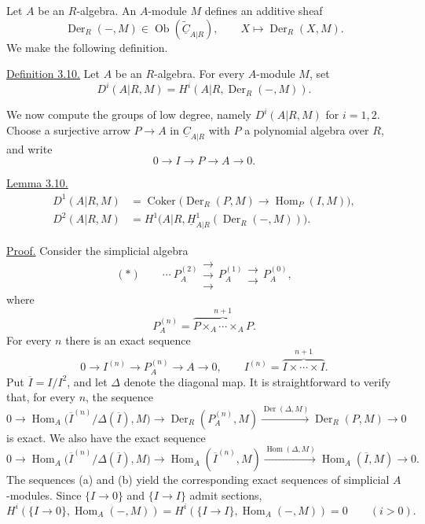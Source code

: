 
Let $A$ be an $R$-algebra. An $A$-module $M$ defines an additive
sheaf
\[
 \operatorname{Der}_R(-,M)
 \in\operatorname{Ob}(\widetilde{\underline C}_{A|R}),
 \qquad X\longmapsto\operatorname{Der}_R(X,M).
\]
We make the following definition.

\underline{Definition 3.10.} Let $A$ be an $R$-algebra. For every
$A$-module $M$, set
\[
 D^i(A|R,M)=H^i(A|R,\operatorname{Der}_R(-,M)).
\]

We now compute the groups of low degree, namely $D^i(A|R,M)$ for
$i=1,2$. Choose a surjective arrow
$P\longrightarrow A$ in $\underline C_{A|R}$ with $P$ a
polynomial algebra over $R$, and write
\[
 0\longrightarrow I\longrightarrow P\longrightarrow A
 \longrightarrow0.
\]

\underline{Lemma 3.10.}
\begin{align*}
 D^1(A|R,M)
 &=\operatorname{Coker}\bigl(
   \operatorname{Der}_R(P,M)\longrightarrow
   \operatorname{Hom}_P(I,M)\bigr),\\
 D^2(A|R,M)
 &=H^1\bigl(A|R,
   \underline H^1_{A|R}(\operatorname{Der}_R(-,M))\bigr).
\end{align*}

\underline{Proof.} Consider the simplicial algebra
\[
 (*)\qquad
 \cdots\ P_A^{(2)}
 \mathrel{\substack{\longrightarrow\\[-.6ex]\longrightarrow\\[-.6ex]\longrightarrow}}
 P_A^{(1)}
 \mathrel{\substack{\longrightarrow\\[-.6ex]\longrightarrow}}
 P_A^{(0)},
\]
where
\[
 P_A^{(n)}=
 \overbrace{P\times_A\cdots\times_AP}^{n+1}.
\]
For every $n$ there is an exact sequence
\[
 0\longrightarrow I^{(n)}\longrightarrow P_A^{(n)}
 \longrightarrow A\longrightarrow0,
 \qquad
 I^{(n)}=\overbrace{I\times\cdots\times I}^{n+1}.
\]
Put $\overline I=I/I^2$, and let $\Delta$ denote the diagonal
map. It is straightforward to verify that, for every $n$, the
sequence
\[
 0\longrightarrow
 \operatorname{Hom}_A
 \bigl(\overline I^{(n)}/\Delta(\overline I),M\bigr)
 \longrightarrow\operatorname{Der}_R(P_A^{(n)},M)
 \xrightarrow{\operatorname{Der}(\Delta,M)}
 \operatorname{Der}_R(P,M)\longrightarrow0
 \tag{a}
\]
is exact. We also have the exact sequence
\[
 0\longrightarrow
 \operatorname{Hom}_A
 \bigl(\overline I^{(n)}/\Delta(\overline I),M\bigr)
 \longrightarrow\operatorname{Hom}_A(\overline I^{(n)},M)
 \xrightarrow{\operatorname{Hom}(\Delta,M)}
 \operatorname{Hom}_A(\overline I,M)\longrightarrow0.
 \tag{b}
\]
The sequences (a) and (b) yield the corresponding exact sequences
of simplicial $A$-modules. Since $\{I\longrightarrow0\}$ and
$\{I\longrightarrow I\}$ admit sections,
\[
 H^i(\{I\longrightarrow0\},\operatorname{Hom}_A(-,M))
 =H^i(\{I\longrightarrow I\},\operatorname{Hom}_A(-,M))=0
 \qquad(i>0).
\]

